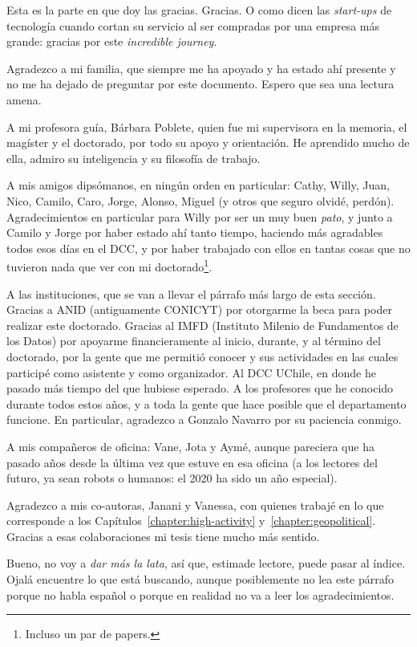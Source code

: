 Esta es la parte en que doy las gracias. Gracias. O como dicen las {\em
start-ups} de tecnología cuando cortan su servicio al ser compradas por una
empresa más grande: gracias por este {\em incredible journey}.

Agradezco a mi familia, que siempre me ha apoyado y ha estado ahí presente y no
me ha dejado de preguntar por este documento. Espero que sea una lectura amena.

A mi profesora guía, Bárbara Poblete, quien fue mi supervisora en la memoria, el
magíster y el doctorado, por todo su apoyo y orientación. He aprendido mucho de
ella, admiro su inteligencia y su filosofía de trabajo.

A mis amigos dipsómanos, en ningún orden en particular: Cathy, Willy, Juan,
Nico, Camilo, Caro, Jorge, Alonso, Miguel (y otros que seguro olvidé, perdón).
Agradecimientos en particular para Willy por ser un muy buen {\em pato}, y junto
a Camilo y Jorge por haber estado ahí tanto tiempo, haciendo más agradables
todos esos días en el DCC, y por haber trabajado con ellos en tantas cosas que
no tuvieron nada que ver con mi doctorado\footnote{Incluso un par de papers.}.

A las instituciones, que se van a llevar el párrafo más largo de esta sección.
Gracias a ANID (antiguamente CONICYT) por otorgarme la beca para poder realizar
este doctorado. Gracias al IMFD (Instituto Milenio de Fundamentos de los Datos)
por apoyarme financieramente al inicio, durante, y al término del doctorado, por
la gente que me permitió conocer y sus actividades en las cuales participé como
asistente y como organizador. Al DCC UChile, en donde he pasado más tiempo del
que hubiese esperado. A los profesores que he conocido durante todos estos años,
y a toda la gente que hace posible que el departamento funcione. En particular,
agradezco a Gonzalo Navarro por su paciencia conmigo.

A mis compañeros de oficina: Vane, Jota y Aymé, aunque pareciera que ha pasado
años desde la última vez que estuve en esa oficina (a los lectores del futuro,
ya sean robots o humanos: el 2020 ha sido un año especial).

Agradezco a mis co-autoras, Janani y Vanessa, con quienes trabajé en lo que
corresponde a los Capítulos~\ref{chapter:high-activity}
y~\ref{chapter:geopolitical}. Gracias a esas colaboraciones mi tesis tiene mucho
más sentido.

Bueno, no voy a {\em dar más la lata}, así que, estimade lectore, puede pasar al
índice. Ojalá encuentre lo que está buscando, aunque posiblemente no lea este
párrafo porque no habla español o porque en realidad no va a leer los
agradecimientos.